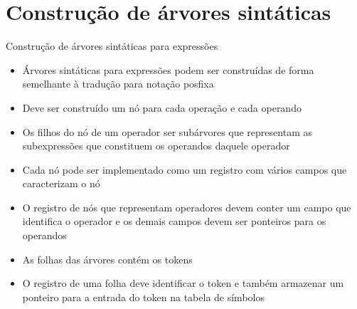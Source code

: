 \section{Construção de árvores sintáticas}

\begin{frame}[fragile]{Construção de árvores sintáticas para expressões}

    \begin{itemize}
        \item Árvores sintáticas para expressões podem ser construídas de forma semelhante à tradução para notação posfixa

        \item Deve ser construído um nó para cada operação e cada operando

        \item Os filhos do nó de um operador ser subárvores que representam as subexpressões que constituem os operandos daquele operador

        \item Cada nó pode ser implementado como um registro com vários campos que caracterizam o nó

        \item O registro de nós que representam operadores devem conter um campo que identifica o operador e os demais campos devem ser ponteiros para os
            operandos

        \item As folhas das árvores contém os tokens

        \item O registro de uma folha deve identificar o token e também armazenar um ponteiro para a entrada do token na tabela de símbolos
    \end{itemize}

\end{frame}

